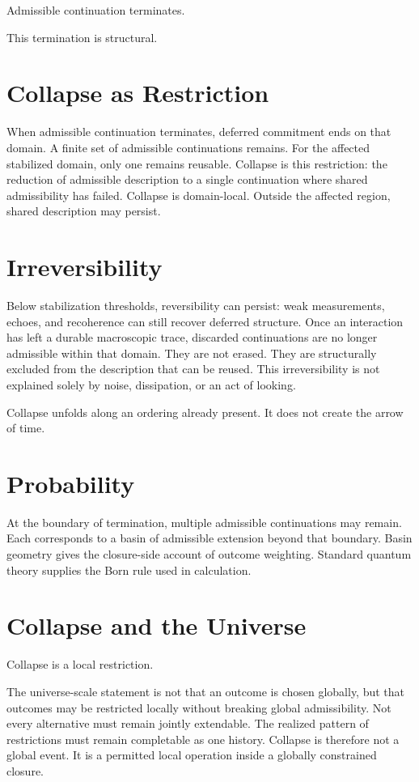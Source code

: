 \documentclass[11pt,twoside,openright]{book}
\begin{document}
Admissible continuation terminates.

This termination is structural.

\section*{Collapse as Restriction}

When admissible continuation terminates, deferred commitment ends on that domain. A finite set of admissible continuations remains. For the affected stabilized domain, only one remains reusable. Collapse is this restriction: the reduction of admissible description to a single continuation where shared admissibility has failed. Collapse is domain-local. Outside the affected region, shared description may persist.

\section*{Irreversibility}

Below stabilization thresholds, reversibility can persist: weak measurements, echoes, and recoherence can still recover deferred structure. Once an interaction has left a durable macroscopic trace, discarded continuations are no longer admissible within that domain. They are not erased. They are structurally excluded from the description that can be reused. This irreversibility is not explained solely by noise, dissipation, or an act of looking.

Collapse unfolds along an ordering already present. It does not create the arrow of time.

\section*{Probability}

At the boundary of termination, multiple admissible continuations may remain. Each corresponds to a basin of admissible extension beyond that boundary. Basin geometry gives the closure-side account of outcome weighting. Standard quantum theory supplies the Born rule used in calculation.

\section*{Collapse and the Universe}

Collapse is a local restriction.

The universe-scale statement is not that an outcome is chosen globally, but that outcomes may be restricted locally without breaking global admissibility. Not every alternative must remain jointly extendable. The realized pattern of restrictions must remain completable as one history. Collapse is therefore not a global event. It is a permitted local operation inside a globally constrained closure.
\end{document}
